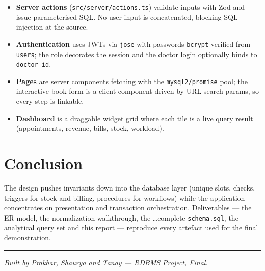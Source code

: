 \documentclass[11pt]{article}
\begin{document}
\begin{itemize}
  \item \textbf{Server actions} (\texttt{src/server/actions.ts}) validate
        inputs with Zod and issue parameterised SQL. No user input is
        concatenated, blocking SQL injection at the source.
  \item \textbf{Authentication} uses JWTs via \texttt{jose} with passwords
        \texttt{bcrypt}-verified from \texttt{users}; the role decorates the
        session and the doctor login optionally binds to \texttt{doctor\_id}.
  \item \textbf{Pages} are server components fetching with the
        \texttt{mysql2/promise} pool; the interactive book form is a client
        component driven by URL search params, so every step is linkable.
  \item \textbf{Dashboard} is a draggable widget grid where each tile is a
        live query result (appointments, revenue, bills, stock, workload).
\end{itemize}

\section{Conclusion}
The design pushes invariants down into the database layer (unique slots,
checks, triggers for stock and billing, procedures for workflows) while the
application concentrates on presentation and transaction orchestration.
Deliverables --- the ER model, the normalization walkthrough, the
\dots{}complete \texttt{schema.sql}, the analytical query set and this
report --- reproduce every artefact used for the final demonstration.

\vspace{1em}
\begin{center}\rule{8cm}{0.4pt}\end{center}

\begin{center}
\emph{Built by Prakhar, Shaurya and Tanay --- RDBMS Project, Final.}
\end{center}
\end{document}
